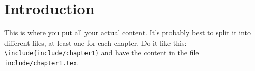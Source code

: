 \chapter{Introduction}
This is where you put all your actual content.
It's probably best to split it into different files, at least one for each chapter.
Do it like this: \texttt{\textbackslash{}include\{include/chapter1\}} and have the content in the file \texttt{include/chapter1.tex}.

\Blindtext[2]


\Blinddocument
